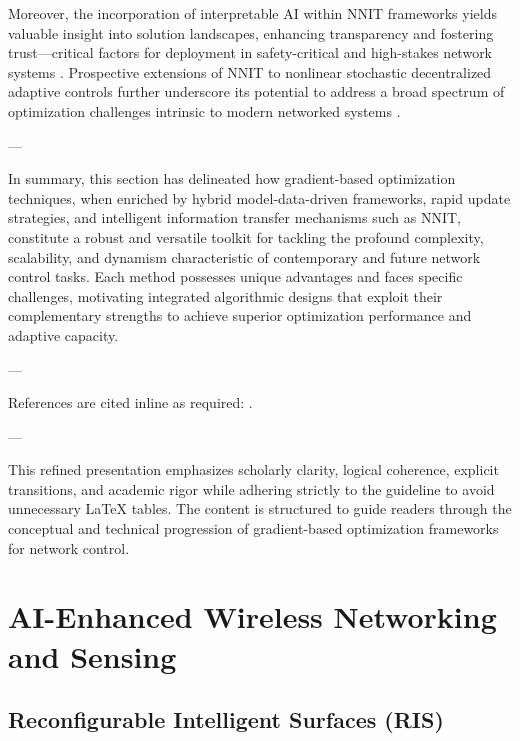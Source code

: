 \documentclass[11pt]{article}
\begin{document}
\begin{itemize}
Moreover, the incorporation of interpretable AI within NNIT frameworks yields valuable insight into solution landscapes, enhancing transparency and fostering trust—critical factors for deployment in safety-critical and high-stakes network systems \cite{ref39}. Prospective extensions of NNIT to nonlinear stochastic decentralized adaptive controls further underscore its potential to address a broad spectrum of optimization challenges intrinsic to modern networked systems \cite{ref40}.

---

In summary, this section has delineated how gradient-based optimization techniques, when enriched by hybrid model-data-driven frameworks, rapid update strategies, and intelligent information transfer mechanisms such as NNIT, constitute a robust and versatile toolkit for tackling the profound complexity, scalability, and dynamism characteristic of contemporary and future network control tasks. Each method possesses unique advantages and faces specific challenges, motivating integrated algorithmic designs that exploit their complementary strengths to achieve superior optimization performance and adaptive capacity.

---

References are cited inline as required: \cite{ref1,ref2,ref3,ref4,ref5,ref6,ref7,ref8,ref9,ref10,ref11,ref12,ref13,ref14,ref15,ref16,ref36,ref37,ref38,ref39,ref40,ref47}.

---

This refined presentation emphasizes scholarly clarity, logical coherence, explicit transitions, and academic rigor while adhering strictly to the guideline to avoid unnecessary LaTeX tables. The content is structured to guide readers through the conceptual and technical progression of gradient-based optimization frameworks for network control.

\section{AI-Enhanced Wireless Networking and Sensing}

\subsection{Reconfigurable Intelligent Surfaces (RIS)}


\end{itemize}
\end{document}
